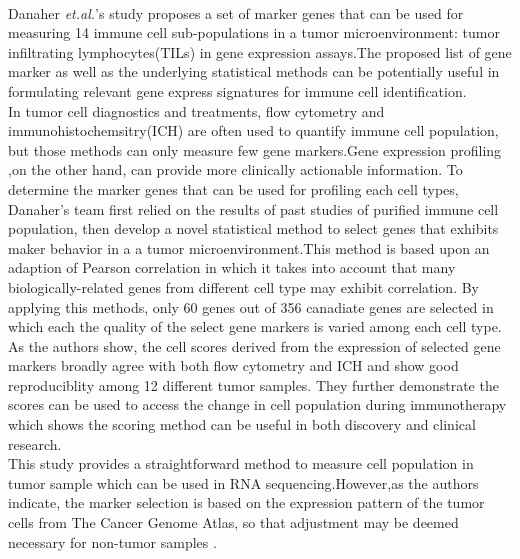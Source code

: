 \documentclass{article}
\begin{document}
\nocite{danaher2017gene}


\medskip
\\

Danaher \textit{et.al.}'s study proposes a set of marker genes that can be used for measuring 14 immune cell sub-populations in a tumor microenvironment: tumor infiltrating lymphocytes(TILs) in gene expression assays.The proposed list of gene marker as well as the underlying statistical methods can be potentially useful in formulating relevant gene express signatures for immune cell identification.\\

In tumor cell diagnostics and treatments, flow cytometry and immunohistochemsitry(ICH) are often used to quantify immune cell population, but those methods can only measure few gene markers.Gene expression profiling ,on the other hand, can provide more clinically actionable information. To determine the marker genes that can be used for profiling each cell types, Danaher's team first relied on the results of past studies of purified immune cell population, then develop a novel statistical method to select genes that exhibits maker behavior in a a tumor microenvironment.This method is based upon an adaption of Pearson correlation in which it takes into account that many biologically-related genes from different cell type may exhibit correlation. By applying this methods, only 60 genes out of 356 canadiate genes are selected in which each the quality of the select gene markers is varied among each cell type. As the authors show, the cell scores derived from the expression of selected gene markers broadly agree with both flow cytometry and ICH and show good reproduciblity among 12 different tumor samples. They further demonstrate the scores  
can be used to access the change in cell population during immunotherapy which shows the scoring method can be useful in both discovery and clinical research.\\

This study provides a straightforward method to measure cell population in tumor sample which can be used in RNA sequencing.However,as the authors indicate, the marker selection is based on the expression pattern of the tumor cells from The Cancer Genome Atlas, so that adjustment may be deemed necessary for non-tumor samples . 
\end{document}
